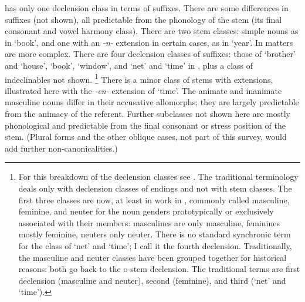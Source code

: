 \documentclass[output=collectionpaper]{langsci/langscibook}
\begin{document}
 has only one declension class in terms of suffixes. There are some differences in suffixes (not shown), all predictable from the phonology of the stem (its final consonant and vowel harmony class). There are two stem classes: simple nouns as in `book', and one with an \textit{-n-} extension in certain cases, as in `year'. In  matters are more complex. There are four declension classes of suffixes: those of `brother' and `house', `book', `window', and `net' and `time' in , plus a class of indeclinables not shown.%
\footnote{%
For this breakdown of the  declension classes see \citet{Corbett1982}. The traditional terminology deals only with declension classes of endings and not with stem classes. The first three classes are now, at least in work in , commonly called masculine, feminine, and neuter for the noun genders prototypically or exclusively associated with their members: masculines are only masculine, feminines mostly feminine, neuters only neuter. There is no standard synchronic term for the class of `net' and `time'; I call it the fourth declension. Traditionally, the masculine and neuter classes have been grouped together for historical reasons: both go back to the  o-stem declension. The traditional terms are first declension (masculine and neuter), second (feminine), and third (`net' and `time').
} %
There is a minor class of stems with extensions, illustrated here with the \textit{-en-} extension of `time'. The animate and inanimate masculine nouns differ in their accusative allomorphs; they are largely predictable from the animacy of the referent. Further subclasses not shown here are mostly phonological and predictable from the final consonant or stress position of the stem. (Plural forms and the other oblique cases, not part of this survey, would add further non-canonicalities.)
\end{document}
